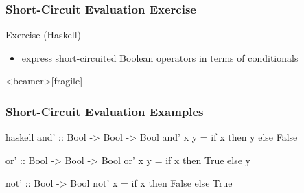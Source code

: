 \documentclass[dvipsnames]{beamer}
\theoremstyle{plain}
\begin{document}
\begin{frame}
  \frametitle{Short-Circuit Evaluation Exercise}

  \begin{block}{Exercise (Haskell)}
    \begin{itemize}
      \item express short-circuited Boolean operators in terms of conditionals
    \end{itemize}
  \end{block}
\end{frame}

\begin{frame}<beamer>[fragile]
  \frametitle{Short-Circuit Evaluation Examples}

  \begin{example}[Haskell]
    \begin{pygments}{haskell}
and' :: Bool -> Bool -> Bool
and' x y = if x then y else False

or' :: Bool -> Bool -> Bool
or' x y = if x then True else y

not' :: Bool -> Bool
not' x = if x then False else True
    \end{pygments}
  \end{example}
\end{frame}
\end{document}

